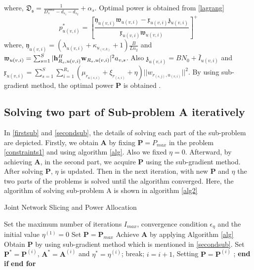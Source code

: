 \documentclass[conference]{IEEEtran}
\begin{document}
where, $\mathfrak{D_s}=\frac{1}{D_{s}^{max}-d_{s_1}-d_{s_2}}+\alpha_s$. Optimal power is obtained from  \eqref{lagrang}
\begin{equation}
p_{u(v,i)}^{*} = [\frac{\mathfrak{y}_{u(v,i)}\mathfrak{w}_{u(v,i)}-\mathfrak{x}_{u(v,i)}\mathfrak{z}_{u(v,i)}}{\mathfrak{x}_{u(v,i)}\mathfrak{w}_{u(v,i)} }]^+
\end{equation}
where, $\mathfrak{y}_{u(v,i)}= (\lambda_{u(v,i)}+\kappa_{u_{(v,k)}}+1)\frac{B}{Ln_2}$ and
$\mathfrak{w}_{u(v,i)} = \sum_{s=1}^{S}|\bold{h}_{R_s,u(v,i)}^H \bold{w}_{R_s,u(v,i)}|^2 a_{v,s}$. Also
$\mathfrak{z}_{u(v,i)} = BN_0 + \bar{I}_{u(v,i)}$ and $\mathfrak{x}_{u(v,i)} = \sum\limits_{s=1}^{S} \sum\limits_{i=1}^{R_s} ( \mu_{r_{u(s,i)}} + \xi_{r_{(s,i)}}+\eta)||w_{r_{(s,j)},u_{(v,i)}}||^2$.
By using sub-gradient method, the optimal power $\boldsymbol{P}$ is obtained \cite{mimoCran}.
\subsection{Solving two part of Sub-problem A iteratively}
In \eqref{firstsub} and \eqref{secondsub}, the details of solving each part of the sub-problem are depicted.
Firstly, we obtain $\boldsymbol{A}$ by fixing $\boldsymbol{P} = P_{max}$ in the problem \eqref{constraints1} and using algorithm \eqref{alg}. Also we fixed $\eta = 0$. Afterward, by achieving $\boldsymbol{A}$, in the second part, we acquire $\boldsymbol{P}$ using the sub-gradient method. After solving $\boldsymbol{P}$, $\eta$ is updated. Then in the next iteration, with new $\boldsymbol{P}$
and $\eta$ the two parts of the problems is solved until the algorithm converged.
Here, the algorithm of solving sub-problem A is shown in algorithm \eqref{alg2}
\begin{algorithm}
\caption{Joint Network Slicing and Power Allocation}\label{alg2}
\begin{algorithmic}[1]
\State Set the maximum number of iterations $I_{max}$, convergence condition $\epsilon_{\eta}$  and the initial value $\eta^{(1)} = 0$
\State Set $\boldsymbol{P} = \boldsymbol{P}_{max}$
\State Achieve $\boldsymbol{A}$ by applying Algorithm \eqref{alg}
\State Obtain $\boldsymbol{P}$ by using sub-gradient method which is mentioned in \eqref{secondsub}.
\State Set $\boldsymbol{P}^*= \boldsymbol{P}^{(i)} $, $\boldsymbol{A}^*= \boldsymbol{A}^{(i)} $   and  $ \eta^{*} =\eta^{(i)} $;
\State break;
\Else
\State $i= i+1$, Setting $\boldsymbol{P} = \boldsymbol{P}^{(i)}$ ;
\EndIf
\State \textbf{end if}
\EndFor
\State \textbf{end for}
\end{algorithmic}
\end{algorithm}
\end{document}
